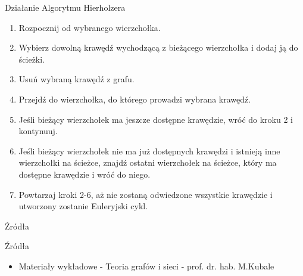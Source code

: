 \documentclass[polish,envcountsect,10pt]{beamer}
\begin{document}
\begin{frame}{Działanie Algorytmu Hierholzera}
    \begin{enumerate}
        \item Rozpocznij od wybranego wierzchołka.
        \item Wybierz dowolną krawędź wychodzącą z bieżącego wierzchołka i dodaj ją do ścieżki.
        \item Usuń wybraną krawędź z grafu.
        \item Przejdź do wierzchołka, do którego prowadzi wybrana krawędź.
        \item Jeśli bieżący wierzchołek ma jeszcze dostępne krawędzie, wróć do kroku 2 i kontynuuj.
        \item Jeśli bieżący wierzchołek nie ma już dostępnych krawędzi i istnieją inne wierzchołki na ścieżce, znajdź ostatni wierzchołek na ścieżce, który ma dostępne krawędzie i wróć do niego.
        \item Powtarzaj kroki 2-6, aż nie zostaną odwiedzone wszystkie krawędzie i utworzony zostanie Euleryjski cykl.
    \end{enumerate}
\end{frame}

\begin{frame}{Źródła}
\begin{block}{Źródła}
    \begin{itemize}
        \item Materiały wykładowe - Teoria grafów i sieci - prof. dr. hab. M.Kubale
    \end{itemize}
\end{block}
\end{frame}
\end{document}
